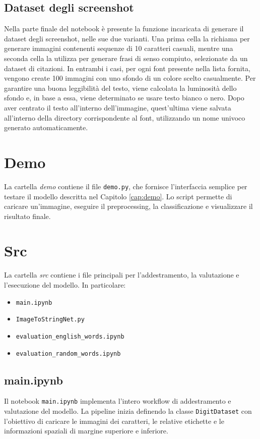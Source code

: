 \subsection{Dataset degli screenshot}
Nella parte finale del notebook è presente la funzione incaricata di generare il dataset degli screenshot, nelle sue due varianti. Una prima cella la richiama per generare immagini contenenti sequenze di 10 caratteri casuali, mentre una seconda cella la utilizza per generare frasi di senso compiuto, selezionate da un dataset di citazioni. In entrambi i casi, per ogni font presente nella lista fornita, vengono create 100 immagini con uno sfondo di un colore scelto casualmente. Per garantire una buona leggibilità del testo, viene calcolata la luminosità dello sfondo e, in base a essa, viene determinato se usare testo bianco o nero. Dopo aver centrato il testo all’interno dell’immagine, quest’ultima viene salvata all’interno della directory corrispondente al font, utilizzando un nome univoco generato automaticamente.
\section{Demo}
La cartella \emph{demo} contiene il file \texttt{demo.py}, che fornisce l'interfaccia semplice per testare il modello descritta nel Capitolo \ref{cap:demo}. Lo script permette di caricare un'immagine, eseguire il preprocessing, la classificazione e visualizzare il risultato finale.

\section{Src}
La cartella \emph{src} contiene i file principali per l'addestramento, la valutazione e l'esecuzione del modello. In particolare:
\begin{itemize}
    \item \texttt{main.ipynb}
    \item \texttt{ImageToStringNet.py}
    \item \texttt{evaluation\_english\_words.ipynb}
    \item \texttt{evaluation\_random\_words.ipynb}
\end{itemize}

\subsection{main.ipynb}
Il notebook \texttt{main.ipynb} implementa l'intero workflow di addestramento e valutazione del modello. La pipeline inizia definendo la classe \texttt{DigitDataset} con l'obiettivo di caricare le immagini dei caratteri, le relative etichette e le informazioni spaziali di margine superiore e inferiore.

